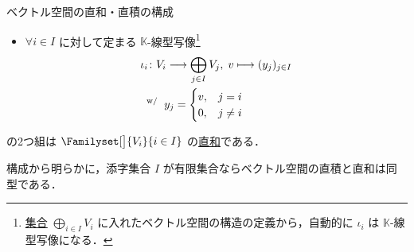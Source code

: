 \documentclass[rep_main]{subfiles}
\begin{document}
\begin{myprop}[label=prop:sum-vec,breakable]{ベクトル空間の直和・直積の構成}
\begin{enumerate}
\begin{itemize}
            \item $\forall i \in I$ に対して定まる $\mathbb{K}$-線型写像\footnote{\underline{集合} $\bigoplus_{i \in I} V_i$ に入れたベクトル空間の構造の定義から，自動的に $\iota_i$ は $\mathbb{K}$-線型写像になる．}
            \begin{align}
                &\iota_i \colon V_i \longrightarrow \bigoplus_{j \in I} V_j,\; v \longmapsto (y_j)_{j \in I} \\
                &\mathrel{} {}^{\mathrm{w}/} \mathrel{} y_j = \begin{cases}
                    v, &j=i \\
                    0, &j\neq i
                \end{cases}
            \end{align}
        \end{itemize}
        の2つ組は $\Familyset[\big]{V_i}{i\in I}$ の\hyperref[def:univ-vec-sum]{直和}である．
    \end{enumerate}
    
\end{myprop}

\begin{marker}
    構成から明らかに，添字集合 $I$ が有限集合ならベクトル空間の直積と直和は同型である．
\end{marker}
\end{document}
